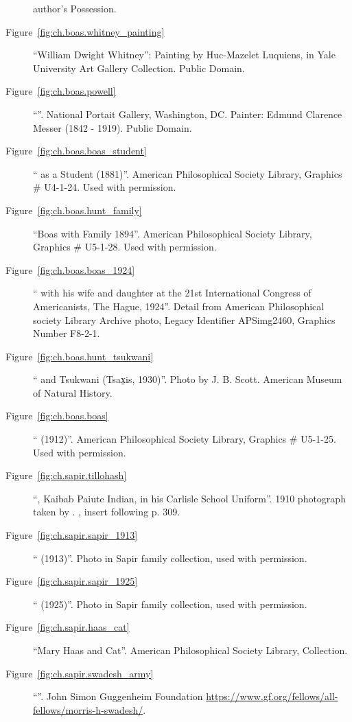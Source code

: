 \begin{description}
  author's Possession.
\item[Figure~\ref{fig:ch.boas.whitney_painting}] ``William Dwight
  Whitney'': Painting by Huc-Mazelet Luquiens, in Yale University Art
  Gallery Collection. Public Domain.
\item[Figure~\ref{fig:ch.boas.powell}] ``''. National
  Portait Gallery, Washington, DC. Painter: Edmund Clarence Messer
  (1842 - 1919). Public Domain.
\item[Figure~\ref{fig:ch.boas.boas_student}] `` as a Student
  (1881)''. American Philosophical Society Library, Graphics \#
  U4-1-24. Used with permission.
\item[Figure~\ref{fig:ch.boas.hunt_family}] ``Boas with 
  Family 1894''. American Philosophical Society Library, Graphics \#
  U5-1-28. Used with permission.
\item[Figure~\ref{fig:ch.boas.boas_1924}] `` with his wife
  and daughter at the 21st International Congress of Americanists, The
  Hague, 1924''. Detail from American Philosophical society Library
  Archive photo, Legacy Identifier APSimg2460, Graphics Number F8-2-1.
\item[Figure~\ref{fig:ch.boas.hunt_tsukwani}] `` and
  Tsukwani (Tsax̠is, 1930)''. Photo by J. B. Scott. American Museum of
Natural History.
\item[Figure~\ref{fig:ch.boas.boas}] `` (1912)''. American
  Philosophical Society Library, Graphics \# U5-1-25. Used with permission.
\item[Figure~\ref{fig:ch.sapir.tillohash}] ``, Kaibab
  Paiute Indian, in his Carlisle School Uniform''. 1910 photograph
  taken by . \citealt{sapir30:ute.texts}, insert following
  p. 309.
\item[Figure~\ref{fig:ch.sapir.sapir_1913}] `` (1913)''.
  Photo in Sapir family collection, used with permission.
\item[Figure~\ref{fig:ch.sapir.sapir_1925}] `` (1925)''.
  Photo in Sapir family collection, used with permission.
\item[Figure~\ref{fig:ch.sapir.haas_cat}] ``Mary Haas and
  Cat''. American Philosophical Society Library, 
  Collection. 
\item[Figure~\ref{fig:ch.sapir.swadesh_army}] ``''.
  John Simon Guggenheim Foundation
  \url{https://www.gf.org/fellows/all-fellows/morris-h-swadesh/}.

\end{description}
